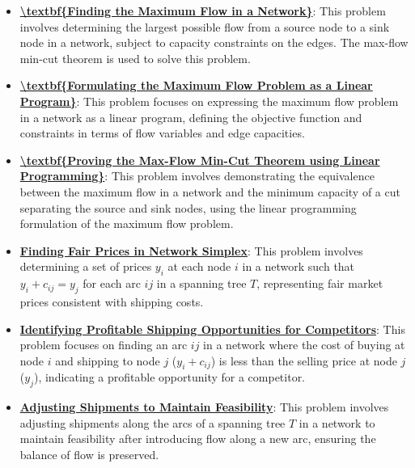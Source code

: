 \documentclass{article}%
\begin{document}
\begin{itemize}[leftmargin=*]%
\item \href{https://www.math.purdue.edu/~yipn/421/2024-11-19-MaxFlowMinCut.pdf#page=1}{\textbf{\textbackslash{}textbf\{Finding the Maximum Flow in a Network\}}}: This problem involves determining the largest possible flow from a source node to a sink node in a network, subject to capacity constraints on the edges. The max-flow min-cut theorem is used to solve this problem.%
\item \href{https://www.math.purdue.edu/~yipn/421/2024-11-19-MaxFlowMinCut.pdf#page=14}{\textbf{\textbackslash{}textbf\{Formulating the Maximum Flow Problem as a Linear Program\}}}: This problem focuses on expressing the maximum flow problem in a network as a linear program, defining the objective function and constraints in terms of flow variables and edge capacities.%
\item \href{https://www.math.purdue.edu/~yipn/421/2024-11-19-MaxFlowMinCut.pdf#page=8}{\textbf{\textbackslash{}textbf\{Proving the Max{-}Flow Min{-}Cut Theorem using Linear Programming\}}}: This problem involves demonstrating the equivalence between the maximum flow in a network and the minimum capacity of a cut separating the source and sink nodes, using the linear programming formulation of the maximum flow problem.%
\end{itemize}%
\begin{itemize}[leftmargin=*]%
\item \href{https://www.math.purdue.edu/~yipn/421/2024-11-21-EconNetSimplex.pdf#page=4}{\textbf{Finding Fair Prices in Network Simplex}}: This problem involves determining a set of prices $y_i$ at each node $i$ in a network such that $y_i + c_{ij} = y_j$ for each arc $ij$ in a spanning tree $T$, representing fair market prices consistent with shipping costs.%
\item \href{https://www.math.purdue.edu/~yipn/421/2024-11-21-EconNetSimplex.pdf#page=5}{\textbf{Identifying Profitable Shipping Opportunities for Competitors}}: This problem focuses on finding an arc $ij$ in a network where the cost of buying at node $i$ and shipping to node $j$ ($y_i + c_{ij}$) is less than the selling price at node $j$ ($y_j$), indicating a profitable opportunity for a competitor.%
\item \href{https://www.math.purdue.edu/~yipn/421/2024-11-21-EconNetSimplex.pdf#page=6}{\textbf{Adjusting Shipments to Maintain Feasibility}}: This problem involves adjusting shipments along the arcs of a spanning tree $T$ in a network to maintain feasibility after introducing flow along a new arc, ensuring the balance of flow is preserved.%
\end{itemize}%
\end{document}
